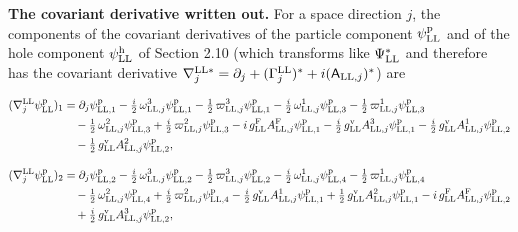 \documentclass[
  10pt,
]{article}
\begin{document}
\textbf{The covariant derivative written out.} For a space direction
\(j\), the components of the covariant derivatives of the particle
component \(\psi^{\rm p}_{\rm LL}\) and of the hole component
\(\psi^{\rm h}_{\rm LL}\) of Section 2.10 (which transforms like
\(\Psi^*_{\rm LL}\) and therefore has the covariant derivative
\(\nabla^{{\rm LL}*}_j=\partial_j+(\Gamma^{\rm LL}_j)^*+i(\mathsf A_{{\rm LL},j})^*\))
are

\[\begin{aligned}
(\nabla^{\rm LL}_j\psi^{\rm p}_{\rm LL})_1&=\partial_j\psi^{\rm p}_{{\rm LL},1}-\tfrac{i}{2}\,\omega^{3}_{{\rm LL},j}\psi^{\rm p}_{{\rm LL},1}-\tfrac{1}{2}\,\varpi^{3}_{{\rm LL},j}\psi^{\rm p}_{{\rm LL},1}-\tfrac{i}{2}\,\omega^{1}_{{\rm LL},j}\psi^{\rm p}_{{\rm LL},3}-\tfrac{1}{2}\,\varpi^{1}_{{\rm LL},j}\psi^{\rm p}_{{\rm LL},3}\\
&\quad -\tfrac{1}{2}\,\omega^{2}_{{\rm LL},j}\psi^{\rm p}_{{\rm LL},3}+\tfrac{i}{2}\,\varpi^{2}_{{\rm LL},j}\psi^{\rm p}_{{\rm LL},3}-i\,g^{\rm F}_{\rm LL}A^{\rm F}_{{\rm LL},j}\psi^{\rm p}_{{\rm LL},1}-\tfrac{i}{2}\,g^{\rm v}_{\rm LL}A^{3}_{{\rm LL},j}\psi^{\rm p}_{{\rm LL},1}-\tfrac{i}{2}\,g^{\rm v}_{\rm LL}A^{1}_{{\rm LL},j}\psi^{\rm p}_{{\rm LL},2}\\
&\quad -\tfrac{1}{2}\,g^{\rm v}_{\rm LL}A^{2}_{{\rm LL},j}\psi^{\rm p}_{{\rm LL},2},
\end{aligned}\]

\[\begin{aligned}
(\nabla^{\rm LL}_j\psi^{\rm p}_{\rm LL})_2&=\partial_j\psi^{\rm p}_{{\rm LL},2}-\tfrac{i}{2}\,\omega^{3}_{{\rm LL},j}\psi^{\rm p}_{{\rm LL},2}-\tfrac{1}{2}\,\varpi^{3}_{{\rm LL},j}\psi^{\rm p}_{{\rm LL},2}-\tfrac{i}{2}\,\omega^{1}_{{\rm LL},j}\psi^{\rm p}_{{\rm LL},4}-\tfrac{1}{2}\,\varpi^{1}_{{\rm LL},j}\psi^{\rm p}_{{\rm LL},4}\\
&\quad -\tfrac{1}{2}\,\omega^{2}_{{\rm LL},j}\psi^{\rm p}_{{\rm LL},4}+\tfrac{i}{2}\,\varpi^{2}_{{\rm LL},j}\psi^{\rm p}_{{\rm LL},4}-\tfrac{i}{2}\,g^{\rm v}_{\rm LL}A^{1}_{{\rm LL},j}\psi^{\rm p}_{{\rm LL},1}+\tfrac{1}{2}\,g^{\rm v}_{\rm LL}A^{2}_{{\rm LL},j}\psi^{\rm p}_{{\rm LL},1}-i\,g^{\rm F}_{\rm LL}A^{\rm F}_{{\rm LL},j}\psi^{\rm p}_{{\rm LL},2}\\
&\quad +\tfrac{i}{2}\,g^{\rm v}_{\rm LL}A^{3}_{{\rm LL},j}\psi^{\rm p}_{{\rm LL},2},
\end{aligned}\]
\end{document}
